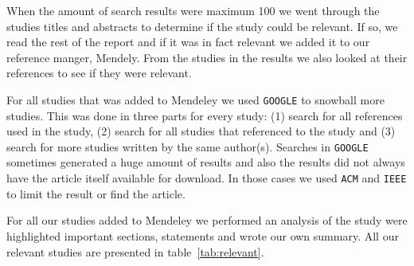 \documentclass[11pt, oneside]{article}   	%
\begin{document}
\FloatBarrier
{}
When the amount of search results were maximum 100 we went through the studies titles and abstracts to determine if the study could be relevant. If so, we read the rest of the report and if it was in fact relevant we added it to our reference manger, Mendely. From the studies in the results we also looked at their references to see if they were relevant.

For all studies that was added to Mendeley we used \texttt{GOOGLE} to snowball more studies. This was done in three parts for every study: (1) search for all references used in the study, (2) search for all studies that referenced to the study and (3) search for more studies written by the same author(s). Searches in \texttt{GOOGLE} sometimes generated a huge amount of results and also the results did not always have the article itself available for download. In those cases we used \texttt{ACM} and \texttt{IEEE} to limit the result or find the article.

For all our studies added to Mendeley we performed an analysis of the study were highlighted important sections, statements and wrote our own summary. All our relevant studies are presented in table~\ref{tab:relevant}.
\end{document}
